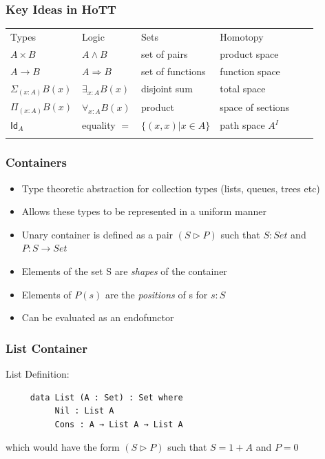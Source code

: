 \documentclass{beamer}
\begin{document}
\begin{frame}
\frametitle{Key Ideas in HoTT}
\begin{table}
\begin{tabular}{l l l l l l}
\toprule
Types & Logic & Sets & Homotopy\\ \addlinespace[2pt]
\midrule
$A\times B$ & $A\wedge B$ & set of pairs & product space\\ \addlinespace[2pt]
$A\to B$ & $A\Rightarrow B$ & set of functions & function space\\ \addlinespace[2pt]
$\Sigma _{(x:A)} B(x)$ &  $\exists_{x:A}B(x)$ & disjoint sum & total space\\ \addlinespace[2pt]
$\Pi_{(x:A)}B(x)$ &  $\forall_{x:A}B(x)$ & product & space of sections\\ \addlinespace[2pt]
$\mathsf{Id}_{A}$ & equality $=$ & $\{(x,x) | x\in A\}$ & path space $A^I$ \\ \addlinespace[2pt]
\bottomrule
\end{tabular}
\end{table}
\end{frame}


\begin{frame}
\frametitle{Containers}
\begin{itemize}
\item Type theoretic abstraction for collection types (lists, queues, trees etc)
\item Allows these types to be represented in  a uniform manner
\item Unary container is defined as a pair $ (S \rhd P)$ such that $ S : Set $ and $ P : S \to Set $
\item Elements of the set S are \textit{shapes} of the container
\item Elements of $P(s)$ are the \textit{positions} of s for $ s : S $
\item Can be evaluated as an endofunctor
\end{itemize}
\end{frame}


\begin{frame}[fragile] %
\frametitle{List Container}
List Definition:
\begin{verbatim}
     data List (A : Set) : Set where
          Nil : List A
          Cons : A → List A → List A
\end{verbatim}
which would have the form $ (S \rhd P)$ such that $ S = 1 + A $ and $ P = 0 $
\end{frame}
\end{document}
